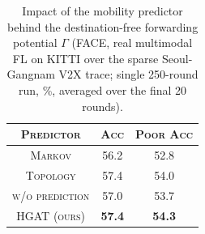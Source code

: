 \begin{table}[t]
    \centering
    \caption{Impact of the mobility predictor behind the destination-free forwarding potential $\Gamma$ (FACE, real multimodal FL on KITTI over the sparse Seoul-Gangnam V2X trace; single 250-round run, \%, averaged over the final 20 rounds).}
    \label{tab:mobpred}
    \renewcommand{\arraystretch}{1.15}
    \setlength{\tabcolsep}{4.5pt}
    \begin{tabular}{c|c|c}
        \hline
        \textsc{Predictor} & \textsc{Acc} & \textsc{Poor Acc} \\
        \hline
        \textsc{Markov} & 56.2 & 52.8 \\
        \textsc{Topology} & 57.4 & 54.0 \\
        \textsc{w/o prediction} & 57.0 & 53.7 \\
        \hline
        \textsc{HGAT (ours)} & \textbf{57.4} & \textbf{54.3} \\
        \hline
    \end{tabular}
\end{table}
